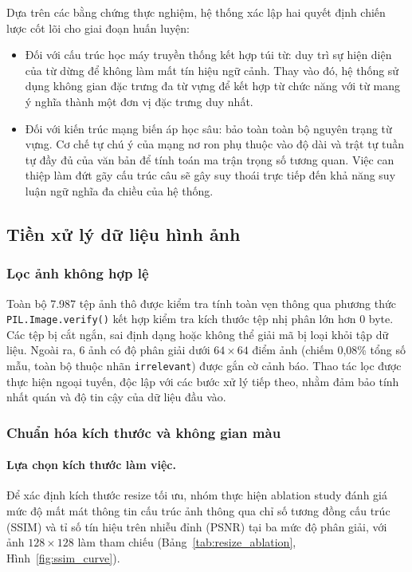 Dựa trên các bằng chứng thực nghiệm, hệ thống xác lập hai quyết định chiến lược cốt lõi cho giai đoạn huấn luyện:

\begin{itemize}[labelsep=10pt, leftmargin=2cm]
    \item Đối với cấu trúc học máy truyền thống kết hợp túi từ: duy trì sự hiện diện của từ dừng để không làm mất tín hiệu ngữ cảnh. Thay vào đó, hệ thống sử dụng không gian đặc trưng đa từ vựng để kết hợp từ chức năng với từ mang ý nghĩa thành một đơn vị đặc trưng duy nhất.
    \item Đối với kiến trúc mạng biến áp học sâu: bảo toàn toàn bộ nguyên trạng từ vựng. Cơ chế tự chú ý của mạng nơ ron phụ thuộc vào độ dài và trật tự tuần tự đầy đủ của văn bản để tính toán ma trận trọng số tương quan. Việc can thiệp làm đứt gãy cấu trúc câu sẽ gây suy thoái trực tiếp đến khả năng suy luận ngữ nghĩa đa chiều của hệ thống.
\end{itemize}
\subsection{Tiền xử lý dữ liệu hình ảnh}

\subsubsection{Lọc ảnh không hợp lệ}

Toàn bộ 7.987 tệp ảnh thô được kiểm tra tính toàn vẹn thông qua phương thức
\texttt{PIL.Image.verify()} kết hợp kiểm tra kích thước tệp nhị phân lớn hơn
0 byte. Các tệp bị cắt ngắn, sai định dạng hoặc không thể giải mã bị loại khỏi
tập dữ liệu. Ngoài ra, 6 ảnh có độ phân giải dưới $64 \times 64$ điểm ảnh
(chiếm 0,08\% tổng số mẫu, toàn bộ thuộc nhãn \texttt{irrelevant}) được gắn cờ
cảnh báo. Thao tác lọc được thực hiện ngoại tuyến, độc lập với các bước xử lý
tiếp theo, nhằm đảm bảo tính nhất quán và độ tin cậy của dữ liệu đầu vào.

\subsubsection{Chuẩn hóa kích thước và không gian màu}

\paragraph{Lựa chọn kích thước làm việc.}
Để xác định kích thước resize tối ưu, nhóm thực hiện ablation study đánh giá
mức độ mất mát thông tin cấu trúc ảnh thông qua chỉ số tương đồng cấu trúc
(SSIM) và tỉ số tín hiệu trên nhiễu đỉnh (PSNR) tại ba mức độ phân giải, với
ảnh $128 \times 128$ làm tham chiếu (Bảng~\ref{tab:resize_ablation},
Hình~\ref{fig:ssim_curve}).

